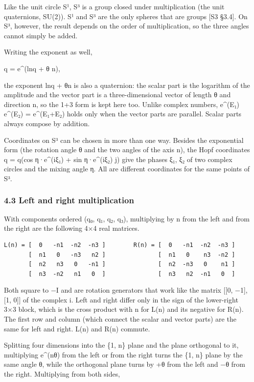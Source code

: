 \documentclass[
  a4paper,
]{article}
\begin{document}
Like the unit circle S¹, S³ is a group closed under multiplication (the
unit quaternions, SU(2)). S¹ and S³ are the only spheres that are groups
{[}S3 §3.4{]}. On S³, however, the result depends on the order of
multiplication, so the three angles cannot simply be added.

Writing the exponent as well,

q = e\^{}(ln\textbar q\textbar{} + θ n),

the exponent ln\textbar q\textbar{} + θn is also a quaternion: the
scalar part is the logarithm of the amplitude and the vector part is a
three-dimensional vector of length θ and direction n, so the 1+3 form is
kept here too. Unlike complex numbers, e\^{}(E₁) e\^{}(E₂) =
e\^{}(E₁+E₂) holds only when the vector parts are parallel. Scalar parts
always compose by addition.

Coordinates on S³ can be chosen in more than one way. Besides the
exponential form (the rotation angle θ and the two angles of the axis
n), the Hopf coordinates q = \textbar q\textbar(cos η·e\^{}(iξ₁) + sin
η·e\^{}(iξ₂) j) give the phases ξ₁, ξ₂ of two complex circles and the
mixing angle η. All are different coordinates for the same points of S³.

\subsubsection{4.3 Left and right
multiplication}\label{left-and-right-multiplication}

With components ordered (q₀, q₁, q₂, q₃), multiplying by n from the left
and from the right are the following 4×4 real matrices.

\begin{verbatim}
L(n) = [  0   -n1  -n2  -n3 ]        R(n) = [  0   -n1  -n2  -n3 ]
       [  n1   0   -n3   n2 ]               [  n1   0    n3  -n2 ]
       [  n2   n3   0   -n1 ]               [  n2  -n3   0    n1 ]
       [  n3  -n2   n1   0  ]               [  n3   n2  -n1   0  ]
\end{verbatim}

Both square to −I and are rotation generators that work like the matrix
{[}{[}0, −1{]}, {[}1, 0{]}{]} of the complex i. Left and right differ
only in the sign of the lower-right 3×3 block, which is the cross
product with n for L(n) and its negative for R(n). The first row and
column (which connect the scalar and vector parts) are the same for left
and right. L(n) and R(n) commute.

Splitting four dimensions into the \{1, n\} plane and the plane
orthogonal to it, multiplying e\^{}(nθ) from the left or from the right
turns the \{1, n\} plane by the same angle θ, while the orthogonal plane
turns by +θ from the left and −θ from the right. Multiplying from both
sides,
\end{document}
